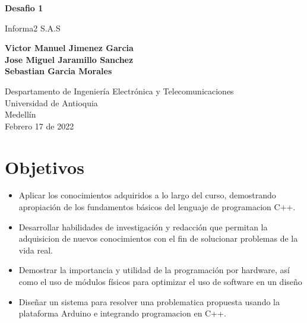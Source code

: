 \documentclass{article}
\begin{document}
\begin{titlepage}
    \begin{center}
        \vspace*{1cm}
            
        \Huge
        \textbf{Desafio 1}
            
        \vspace{0.5cm}
        \LARGE
        Informa2 S.A.S
            
        \vspace{1.5cm}
            
        \textbf{Victor Manuel Jimenez Garcia\\
                Jose Miguel Jaramillo Sanchez\\
                Sebastian Garcia Morales}

        \vfill
            
        \vspace{0.8cm}
            
        \Large
        Despartamento de Ingeniería Electrónica y Telecomunicaciones\\
        Universidad de Antioquia\\
        Medellín\\
        Febrero 17 de 2022
            
    \end{center}
\end{titlepage}

\tableofcontents

\newpage
\section{Objetivos}\label{objetivos}
\begin{itemize}
    \item Aplicar los conocimientos adquiridos a lo largo del curso, demostrando apropiación de los fundamentos básicos del lenguaje de programacion C++.
    \item Desarrollar habilidades de investigación y redacción que permitan la adquisicion de nuevos conocimientos con el fin de solucionar problemas de la vida real.
    \item Demostrar la importancia y utilidad de la programación por hardware, así como el uso de módulos físicos para optimizar el uso de software en un diseño
    \item Diseñar un sistema para resolver una problematica propuesta usando la plataforma Arduino e integrando programacion en C++.
\end{itemize}
\end{document}
